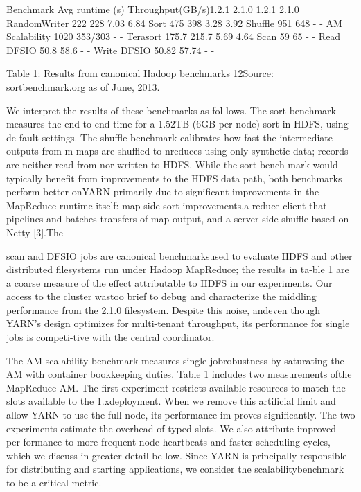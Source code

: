 Benchmark Avg runtime (s) Throughput(GB/s)1.2.1 2.1.0 1.2.1 2.1.0
RandomWriter 222 228 7.03 6.84
Sort 475 398 3.28 3.92
Shuffle 951 648 - -
AM Scalability 1020 353/303 - -
Terasort 175.7 215.7 5.69 4.64
Scan 59 65 - -
Read DFSIO 50.8 58.6 - -
Write DFSIO 50.82 57.74 - -

Table 1: Results from canonical Hadoop benchmarks
12Source: sortbenchmark.org as of June, 2013.

We interpret the results of these benchmarks as fol-lows. The sort benchmark measures the end-to-end time
for a 1.52TB (6GB per node) sort in HDFS, using de-fault settings. The shuffle benchmark calibrates how fast
the intermediate outputs from m maps are shuffled to nreduces using only synthetic data; records are neither
read from nor written to HDFS. While the sort bench-mark would typically benefit from improvements to the
HDFS data path, both benchmarks perform better onYARN primarily due to significant improvements in the
MapReduce runtime itself: map-side sort improvements,a reduce client that pipelines and batches transfers of
map output, and a server-side shuffle based on Netty [3].The

scan and DFSIO jobs are canonical benchmarksused to evaluate HDFS and other distributed filesystems run under Hadoop MapReduce; the results in ta-ble 1 are a coarse measure of the effect attributable to
HDFS in our experiments. Our access to the cluster wastoo brief to debug and characterize the middling performance from the 2.1.0 filesystem. Despite this noise, andeven though YARN's design optimizes for multi-tenant
throughput, its performance for single jobs is competi-tive with the central coordinator.

The AM scalability benchmark measures single-jobrobustness by saturating the AM with container bookkeeping duties. Table 1 includes two measurements ofthe MapReduce AM. The first experiment restricts available resources to match the slots available to the 1.xdeployment. When we remove this artificial limit and
allow YARN to use the full node, its performance im-proves significantly. The two experiments estimate the
overhead of typed slots. We also attribute improved per-formance to more frequent node heartbeats and faster
scheduling cycles, which we discuss in greater detail be-low. Since YARN is principally responsible for distributing and starting applications, we consider the scalabilitybenchmark to be a critical metric.

